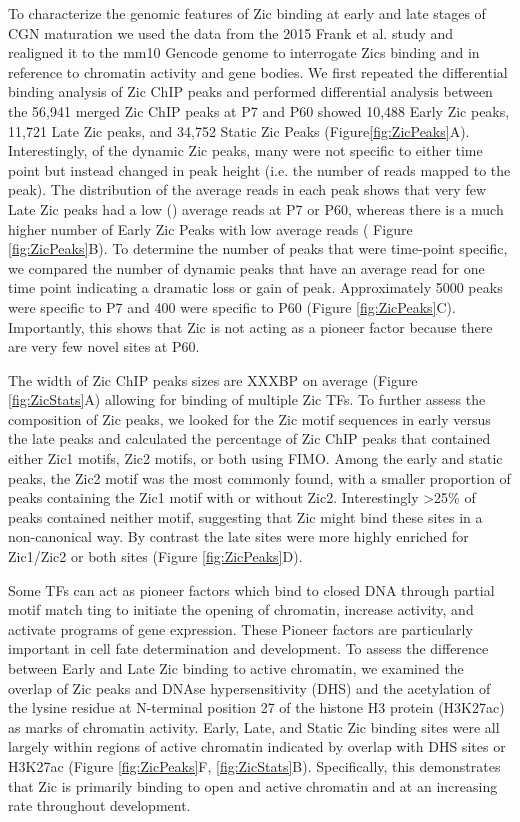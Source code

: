 \documentclass[fleqn,10pt]{wlscirep}
\begin{document}
To characterize the genomic features of Zic binding at early and late stages of CGN maturation we used the data from the 2015 Frank et al. study \cite{Frank2015RegulationCerebellum} and realigned it to the mm10 Gencode genome to interrogate Zics binding and in reference to chromatin activity and gene bodies. We first repeated the differential binding analysis of Zic ChIP peaks and performed differential analysis between the 56,941 merged Zic ChIP peaks at P7 and P60 showed 10,488 Early Zic peaks, 11,721 Late Zic peaks, and 34,752  Static Zic Peaks (Figure\ref{fig:ZicPeaks}A). Interestingly, of the dynamic Zic peaks, many were not specific to either time point but instead changed in peak height (i.e. the number of reads mapped to the peak). The distribution of the average reads in each peak shows  that very few Late Zic peaks had a low () average reads at P7 or P60, whereas there is a much higher number of Early Zic Peaks with low average reads ( Figure \ref{fig:ZicPeaks}B). To determine the number of peaks that were time-point specific, we compared the number of dynamic peaks that have an average read  for one time point  indicating a dramatic loss or gain of peak. Approximately 5000 peaks were specific to P7 and 400 were specific to P60 (Figure \ref{fig:ZicPeaks}C). Importantly, this shows that Zic is not acting as a pioneer factor because there are very few novel sites at P60. 

The width of Zic ChIP peaks sizes are XXXBP on average (Figure \ref{fig:ZicStats}A) allowing for binding of multiple Zic TFs. To further assess the composition of Zic peaks, we looked for the Zic motif sequences in early versus the late peaks and calculated the percentage of Zic ChIP peaks that contained either Zic1 motifs, Zic2 motifs, or both using FIMO.  Among the early and static peaks, the Zic2 motif was the most commonly found, with a smaller proportion of peaks containing the Zic1 motif with or without Zic2. Interestingly >25\% of peaks contained neither motif, suggesting that Zic might bind these sites in a non-canonical way. By contrast the late sites were more highly enriched for Zic1/Zic2 or both sites (Figure \ref{fig:ZicPeaks}D). 

Some TFs can act as pioneer factors which bind to closed DNA through partial motif match ting to initiate the opening of chromatin, increase activity, and activate programs of gene expression. These Pioneer factors are particularly important in cell fate determination and development\cite{Zaret2020PioneerChanges}. To assess the difference between Early and Late Zic binding to active chromatin, we examined the overlap of Zic peaks and DNAse hypersensitivity (DHS) and the acetylation of the lysine residue at N-terminal position 27 of the histone H3 protein (H3K27ac) as marks of chromatin activity. Early, Late, and Static Zic binding sites were all largely within regions of active chromatin indicated by overlap with DHS sites or H3K27ac (Figure \ref{fig:ZicPeaks}F, \ref{fig:ZicStats}B). Specifically, this demonstrates that Zic is primarily binding to open and active chromatin and at an increasing rate throughout development. 
\end{document}
